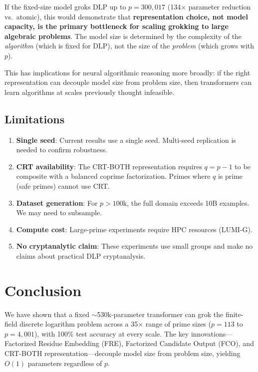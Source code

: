\documentclass[11pt]{article}
\begin{document}
If the fixed-size model groks DLP up to $p = 300{,}017$ (134$\times$ parameter reduction vs.\ atomic), this would demonstrate that \textbf{representation choice, not model capacity, is the primary bottleneck for scaling grokking to large algebraic problems}. The model size is determined by the complexity of the \emph{algorithm} (which is fixed for DLP), not the size of the \emph{problem} (which grows with $p$).

This has implications for neural algorithmic reasoning more broadly: if the right representation can decouple model size from problem size, then transformers can learn algorithms at scales previously thought infeasible.

\subsection{Limitations}

\begin{enumerate}[leftmargin=*]
    \item \textbf{Single seed}: Current results use a single seed. Multi-seed replication is needed to confirm robustness.
    \item \textbf{CRT availability}: The CRT-BOTH representation requires $q = p - 1$ to be composite with a balanced coprime factorization. Primes where $q$ is prime (safe primes) cannot use CRT.
    \item \textbf{Dataset generation}: For $p > 100$k, the full domain exceeds 10B examples. We may need to subsample.
    \item \textbf{Compute cost}: Large-prime experiments require HPC resources (LUMI-G).
    \item \textbf{No cryptanalytic claim}: These experiments use small groups and make no claims about practical DLP cryptanalysis.
\end{enumerate}



\section{Conclusion}
\label{sec:conclusion}

We have shown that a fixed $\sim$530k-parameter transformer can grok the finite-field discrete logarithm problem across a 35$\times$ range of prime sizes ($p = 113$ to $p = 4{,}001$), with 100\% test accuracy at every scale. The key innovations---Factorized Residue Embedding (FRE), Factorized Candidate Output (FCO), and CRT-BOTH representation---decouple model size from problem size, yielding $O(1)$ parameters regardless of $p$.
\end{document}

